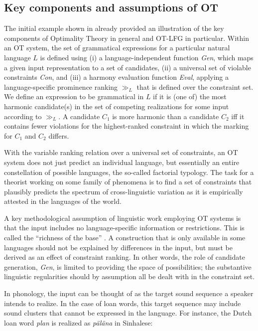 \documentclass[output=paper,hidelinks]{langscibook}
\begin{document}
\subsection{Key components and assumptions of OT}
\label{sec:OT:key-components-assumptions}

The initial example shown in  already provided an illustration of the key components of Optimality Theory in general and OT-LFG in particular. Within an OT system, the set of grammatical expressions for a particular natural language $L$ is defined using (i) a language-independent function \emph{Gen}, which maps a given input representation to a set of candidates, (ii) a universal set of violable constraints \emph{Con}, and (iii) a harmony evaluation function \emph{Eval}, applying a language-specific prominence ranking $\gg_L$ that is defined over the constraint set. We define an expression to be grammatical in $L$ if it is (one of) the most harmonic candidate(s) in the set of competing realizations for some input according to $\gg_L$. A candidate $C_1$ is more harmonic than a candidate $C_2$ iff it contains fewer violations for the highest-ranked constraint in which the marking for $C_1$ and $C_2$ differs.

With the variable ranking relation over a universal set of constraints, an OT system does not just predict an individual language, but essentially an entire constellation of possible languages, the so-called factorial typology. The task for a theorist working on some family of phenomena is to find a set of constraints that plausibly predicts the spectrum of cross-linguistic variation as it is empirically attested in the languages of the world.

A key methodological assumption of linguistic work employing OT systems is that the input includes no language-specific information or restrictions. This is called the ``richness of the base'' \citep{Smolensky1996TheIS}.  %
A construction that is only available in some languages should not be explained by differences in the input, but must be derived as an effect of constraint ranking. In other words, the role of candidate generation, \emph{Gen}, is limited to providing the space of possibilities; the substantive linguistic regularities should by assumption all be dealt with in the constraint set.

In phonology, the input can be thought of as the target sound sequence a speaker intends to realize. In the case of loan words, this target sequence may include sound clusters that cannot be expressed in the language. For instance, the Dutch loan word \emph{plan} is realized as \emph{p\"al\"ana} in Sinhalese:
\end{document}
